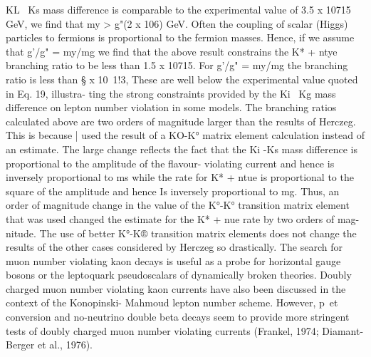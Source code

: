 \documentclass[twoside]{article}
\begin{document}
{{{{{{{{{{{{{{KL ~Ks mass difference is comparable to the experimental value of 3.5 x
10715 GeV, we find that my > g"(2 x 106) GeV. Often the coupling of
scalar (Higgs) particles to fermions is proportional to the fermion
masses. Hence, if we assume that g'/g" = my/mg we find that the above
result constrains the K* + ntye branching ratio to be less than 1.5 x
10715. For g'/g" = my/mg the branching ratio is less than § x 10~1!3,
These are well below the experimental value quoted in Eq. 19, illustra-
ting the strong constraints provided by the Ki ~Kg mass difference on
lepton number violation in some models. The branching ratios calculated
above are two orders of magnitude larger than the results of Herczeg.
This is because | used the result of a KO-K° matrix element calculation
instead of an estimate. The large change reflects the fact that the
Ki -Ks mass difference is proportional to the amplitude of the flavour-
violating current and hence is inversely proportional to ms while the
rate for K* + ntue is proportional to the square of the amplitude and
hence Is inversely proportional to mg. Thus, an order of magnitude
change in the value of the K°-K° transition matrix element that was
used changed the estimate for the K* + nue rate by two orders of mag-
nitude. The use of better K°-K® transition matrix elements does not
change the results of the other cases considered by Herczeg so
drastically.
The search for muon number violating kaon decays is useful as a
probe for horizontal gauge bosons or the leptoquark pseudoscalars of
dynamically broken theories. Doubly charged muon number violating kaon
currents have also been discussed in the context of the Konopinski-
Mahmoud lepton number scheme. However, p~et conversion and no-neutrino
double beta decays seem to provide more stringent tests of doubly charged
muon number violating currents (Frankel, 1974; Diamant-Berger et al., 1976).

}}}}}}}}}}}}}}
\end{document}
